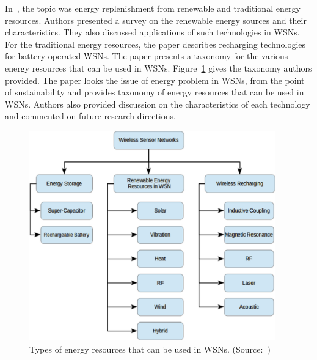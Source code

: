 \documentclass[12pt, oneandhalf, chaparabic, sees, ms]{metu}
\begin{document}
In~\cite{akhtar2015}, the topic was energy replenishment from renewable and traditional energy resources. 
Authors presented a survey on the renewable energy sources and their characteristics. They also discussed
applications of such technologies in WSNs. For the traditional energy resources, the paper describes recharging
technologies for battery-operated WSNs.
The paper presents a taxonomy for the various energy resources that can be used in WSNs. 
Figure~\ref{fig:energy-tax3} gives the taxonomy authors provided. The paper looks the issue of energy problem in WSNs, from the point of sustainability
and provides taxonomy of energy resources that can be used in WSNs. Authors also provided discussion on the characteristics of each technology 
and commented on future research directions.
% 
%
%
\begin{figure}[!htbp]
 \begin{center}
  \includegraphics[width=0.95\textwidth]{energy-tax3.png}
 \end{center}
 \caption{Types of energy resources that can be used in WSNs. (Source:~\protect\cite{akhtar2015})}
  \label{fig:energy-tax3}
\end{figure}
% 
%
%
\end{document}
